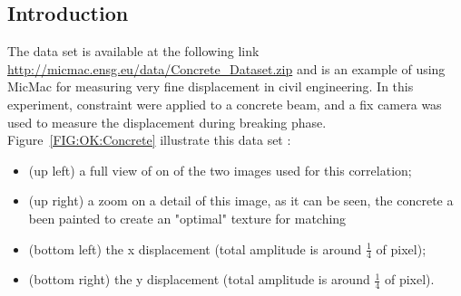 \label{Concrete}

\subsection{Introduction}

The data set is available at the following link \url{http://micmac.ensg.eu/data/Concrete_Dataset.zip} and is an example of using MicMac for measuring very fine displacement in civil engineering. In this experiment, constraint were applied to a concrete beam, and a fix camera was used to measure the displacement during breaking phase. Figure~\ref{FIG:OK:Concrete} illustrate this data set :

\begin{itemize}
    \item  (up left) a full view of on of the two images used for this correlation;
    \item  (up right) a zoom on a detail of this image, as it can be seen, the concrete a been
           painted to create an "optimal" texture for matching
    \item  (bottom left) the x displacement (total amplitude is around $\frac{1}{4}$ of pixel);
    \item  (bottom right) the y displacement (total amplitude is around $\frac{1}{4}$ of pixel).
\end{itemize}

